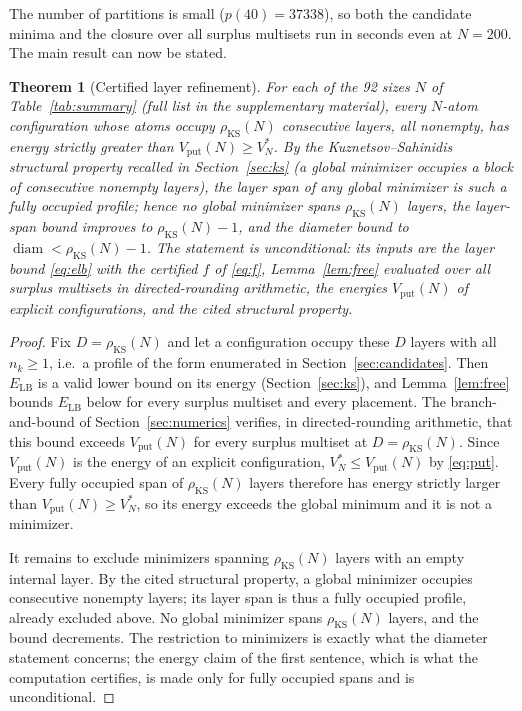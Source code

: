 \documentclass[11pt]{article}
\newtheorem{theorem}{Theorem}
\theoremstyle{remark}
\newcommand{\LB}{\mathrm{LB}}
\newcommand{\KS}{\mathrm{KS}}
\newcommand{\vput}{\mathrm{put}}
\newcommand{\diam}{\operatorname{diam}}
\begin{document}
The number of partitions is small ($p(40)=37338$), so both the candidate minima and the closure over all surplus multisets run in seconds even at $N=200$. The main result can now be stated.

\begin{theorem}[Certified layer refinement]\label{thm:main}
For each of the 92 sizes $N$ of Table~\ref{tab:summary} (full list in the supplementary material), every $N$-atom configuration whose atoms occupy $\rho_\KS(N)$ consecutive layers, all nonempty, has energy strictly greater than $V_\vput(N)\ge V^*_N$. By the Kuznetsov--Sahinidis structural property recalled in Section~\ref{sec:ks} (a global minimizer occupies a block of consecutive nonempty layers), the layer span of any global minimizer is such a fully occupied profile; hence no global minimizer spans $\rho_\KS(N)$ layers, the layer-span bound improves to $\rho_\KS(N)-1$, and the diameter bound to $\diam<\rho_\KS(N)-1$. The statement is unconditional: its inputs are the layer bound \eqref{eq:elb} with the certified $f$ of \eqref{eq:f}, Lemma~\ref{lem:free} evaluated over all surplus multisets in directed-rounding arithmetic, the energies $V_\vput(N)$ of explicit configurations, and the cited structural property.
\end{theorem}

\begin{proof}
Fix $D=\rho_\KS(N)$ and let a configuration occupy these $D$ layers with all $n_k\ge1$, i.e.\ a profile of the form enumerated in Section~\ref{sec:candidates}. Then $E_\LB$ is a valid lower bound on its energy (Section~\ref{sec:ks}), and Lemma~\ref{lem:free} bounds $E_\LB$ below for every surplus multiset and every placement. The branch-and-bound of Section~\ref{sec:numerics} verifies, in directed-rounding arithmetic, that this bound exceeds $V_\vput(N)$ for every surplus multiset at $D=\rho_\KS(N)$. Since $V_\vput(N)$ is the energy of an explicit configuration, $V^*_N\le V_\vput(N)$ by \eqref{eq:put}. Every fully occupied span of $\rho_\KS(N)$ layers therefore has energy strictly larger than $V_\vput(N)\ge V^*_N$, so its energy exceeds the global minimum and it is not a minimizer.

It remains to exclude minimizers spanning $\rho_\KS(N)$ layers with an empty internal layer. By the cited structural property, a global minimizer occupies consecutive nonempty layers; its layer span is thus a fully occupied profile, already excluded above. No global minimizer spans $\rho_\KS(N)$ layers, and the bound decrements. The restriction to minimizers is exactly what the diameter statement concerns; the energy claim of the first sentence, which is what the computation certifies, is made only for fully occupied spans and is unconditional.
\end{proof}
\end{document}
